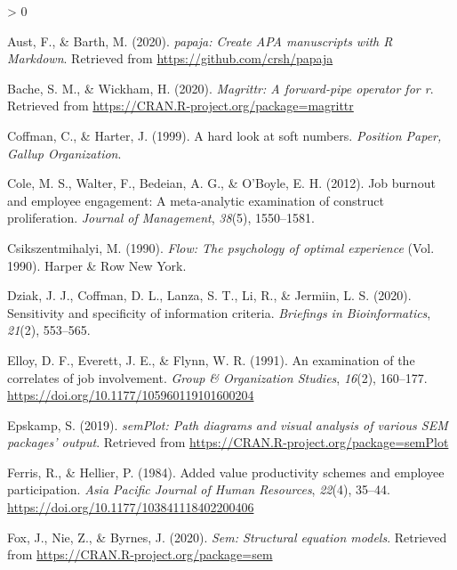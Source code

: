 \documentclass[
  english,
  man]{apa6}
\newlength{\cslhangindent}
\newenvironment{CSLReferences}[2] %
 {%
  \setlength{\parindent}{0pt}
  \ifodd #1 \everypar{\setlength{\hangindent}{\cslhangindent}}\ignorespaces\fi
  \ifnum #2 > 0
  \setlength{\parskip}{#2\baselineskip}
  \fi
 }%
 {}
\begin{document}
\hypertarget{refs}{}
\begin{CSLReferences}{1}{0}
\leavevmode\hypertarget{ref-R-papaja}{}%
Aust, F., \& Barth, M. (2020). \emph{{papaja}: {Create} {APA} manuscripts with {R Markdown}}. Retrieved from \url{https://github.com/crsh/papaja}

\leavevmode\hypertarget{ref-R-magrittr}{}%
Bache, S. M., \& Wickham, H. (2020). \emph{Magrittr: A forward-pipe operator for r}. Retrieved from \url{https://CRAN.R-project.org/package=magrittr}

\leavevmode\hypertarget{ref-coffman_hard_1999}{}%
Coffman, C., \& Harter, J. (1999). A hard look at soft numbers. \emph{Position Paper, Gallup Organization}.

\leavevmode\hypertarget{ref-cole2012job}{}%
Cole, M. S., Walter, F., Bedeian, A. G., \& O'Boyle, E. H. (2012). Job burnout and employee engagement: A meta-analytic examination of construct proliferation. \emph{Journal of Management}, \emph{38}(5), 1550--1581.

\leavevmode\hypertarget{ref-csikszentmihalyi1990flow}{}%
Csikszentmihalyi, M. (1990). \emph{Flow: The psychology of optimal experience} (Vol. 1990). Harper \& Row New York.

\leavevmode\hypertarget{ref-dziak2020sensitivity}{}%
Dziak, J. J., Coffman, D. L., Lanza, S. T., Li, R., \& Jermiin, L. S. (2020). Sensitivity and specificity of information criteria. \emph{Briefings in Bioinformatics}, \emph{21}(2), 553--565.

\leavevmode\hypertarget{ref-elloy_examination_1991}{}%
Elloy, D. F., Everett, J. E., \& Flynn, W. R. (1991). An examination of the correlates of job involvement. \emph{Group \& Organization Studies}, \emph{16}(2), 160--177. \url{https://doi.org/10.1177/105960119101600204}

\leavevmode\hypertarget{ref-R-semPlot}{}%
Epskamp, S. (2019). \emph{semPlot: Path diagrams and visual analysis of various SEM packages' output}. Retrieved from \url{https://CRAN.R-project.org/package=semPlot}

\leavevmode\hypertarget{ref-ferris_added_1984}{}%
Ferris, R., \& Hellier, P. (1984). Added value productivity schemes and employee participation. \emph{Asia Pacific Journal of Human Resources}, \emph{22}(4), 35--44. \url{https://doi.org/10.1177/103841118402200406}

\leavevmode\hypertarget{ref-R-sem}{}%
Fox, J., Nie, Z., \& Byrnes, J. (2020). \emph{Sem: Structural equation models}. Retrieved from \url{https://CRAN.R-project.org/package=sem}


\end{CSLReferences}
\end{document}

